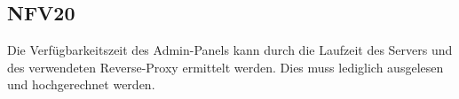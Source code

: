 \subsection*{NFV20}

Die Verfügbarkeitszeit des \Gls{Admin-Panel}s kann durch die Laufzeit des \Gls{Servers} und des verwendeten \Gls{Reverse-Proxy} ermittelt werden.
Dies muss lediglich ausgelesen und hochgerechnet werden.
